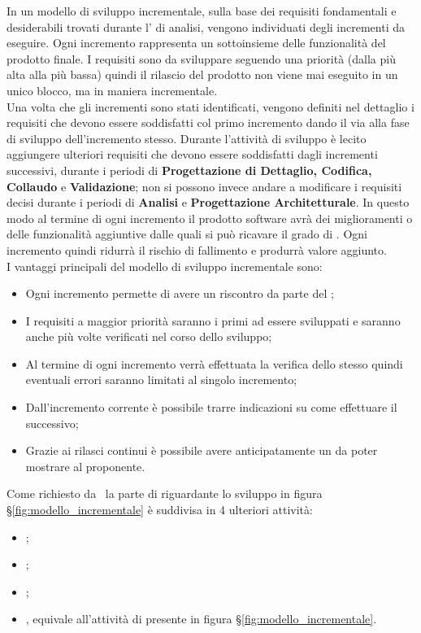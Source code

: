 In un modello di sviluppo incrementale, sulla base dei requisiti fondamentali e desiderabili trovati durante l' di analisi, vengono individuati degli incrementi da eseguire. Ogni incremento rappresenta un sottoinsieme delle funzionalità del prodotto finale. I requisiti sono da sviluppare seguendo una priorità (dalla più alta alla più bassa) quindi il rilascio del prodotto non viene mai eseguito in un unico blocco, ma in maniera incrementale.\\
Una volta che gli incrementi sono stati identificati, vengono definiti nel dettaglio i requisiti che devono essere soddisfatti col primo incremento dando il via alla fase di sviluppo dell'incremento stesso. Durante l’attività di sviluppo è lecito aggiungere ulteriori requisiti che devono essere soddisfatti dagli incrementi successivi, durante i periodi di \textbf{Progettazione di Dettaglio, Codifica, Collaudo} e \textbf{Validazione}; non si possono invece andare a modificare i requisiti decisi durante i periodi di \textbf{Analisi} e \textbf{Progettazione Architetturale}. In questo modo al termine di ogni incremento il prodotto software avrà dei miglioramenti o delle funzionalità aggiuntive dalle quali si può ricavare il grado di . Ogni incremento quindi ridurrà il rischio di fallimento e produrrà valore aggiunto.\\
I vantaggi principali del modello di sviluppo incrementale sono:
\begin{itemize}
    \item Ogni incremento permette di avere un riscontro da parte del ;
    \item I requisiti a maggior priorità saranno i primi ad essere sviluppati e saranno anche più volte verificati nel corso dello sviluppo;
    \item Al termine di ogni incremento verrà effettuata la verifica dello stesso quindi eventuali errori saranno limitati al singolo incremento;
    \item Dall'incremento corrente è possibile trarre indicazioni su come effettuare il successivo;
    \item Grazie ai rilasci continui è possibile avere anticipatamente un  da poter mostrare al proponente.
\end{itemize}

Come richiesto da \Proponente\ la parte di  riguardante lo sviluppo in figura \S\ref{fig:modello_incrementale} è suddivisa in 4 ulteriori attività:
\begin{itemize}
    \item {};
    \item {};
    \item {};
    \item {}, equivale all'attività di  presente in figura \S\ref{fig:modello_incrementale}.
\end{itemize}
